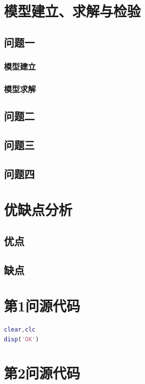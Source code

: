 \documentclass[12pt]{ctexart}
\begin{document}
\begin{spacing}{1.5}
\section{模型建立、求解与检验}
\subsection{问题一}
\subsubsection{模型建立}
\subsubsection{模型求解}
\subsection{问题二}
\subsection{问题三}
\subsection{问题四}

\section{优缺点分析}
\subsection{优点}
\subsection{缺点}


\newpage

\appendix
{}
\section{第1问源代码}
\begin{lstlisting}[title="OK.m",language=matlab]
% 代码段
clear,clc
disp('OK')
\end{lstlisting}

\section{第2问源代码}
{\color{red}{红色}}

\end{spacing}	
\end{document}
